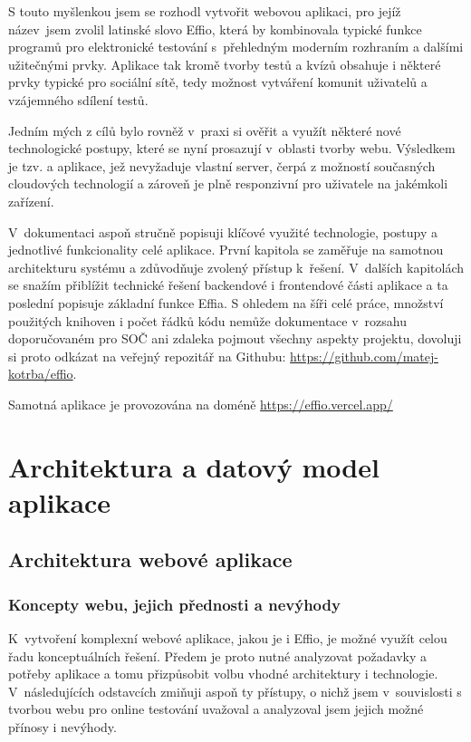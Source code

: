 \documentclass[12pt, a4paper,
openright
]{report}
\let\oldchapter\chapter
\renewcommand{\chapter}{
	\clearpage
	\pagestyle{fancy}
	\oldchapter
}
\begin{document}
S touto myšlenkou jsem se rozhodl vytvořit webovou aplikaci, pro jejíž název~jsem zvolil latinské slovo Effio, která by kombinovala typické funkce programů pro elektronické testování s~přehledným moderním rozhraním a dalšími užitečnými prvky. Aplikace tak kromě tvorby testů a kvízů obsahuje i některé prvky typické pro sociální sítě, tedy možnost vytváření komunit uživatelů a vzájemného sdílení testů. 

Jedním mých z cílů bylo rovněž v~praxi si ověřit a využít některé nové technologické postupy, které se nyní prosazují v~oblasti tvorby webu. Výsledkem je tzv. 
 a  aplikace, jež nevyžaduje vlastní server, čerpá z možností současných cloudových technologií a zároveň je plně responzivní pro uživatele na jakémkoli zařízení.

V~dokumentaci aspoň stručně popisuji klíčové využité technologie, postupy a jednotlivé funkcionality celé aplikace. První kapitola se zaměřuje na samotnou architekturu systému a zdůvodňuje zvolený přístup k~řešení. V~dalších kapitolách se snažím přiblížit technické řešení backendové i frontendové části aplikace a ta poslední popisuje základní funkce Effia. S ohledem na šíři celé práce, množství použitých knihoven i počet řádků kódu nemůže dokumentace v~rozsahu doporučovaném pro SOČ ani zdaleka pojmout všechny aspekty projektu, dovoluji si proto odkázat na veřejný repozitář na Githubu: \url{https://github.com/matej-kotrba/effio}.

Samotná aplikace je provozována na doméně \url{https://effio.vercel.app/}



\chapter{Architektura a datový model aplikace}

\section{Architektura webové aplikace}

\subsection{Koncepty webu, jejich přednosti a nevýhody}
K~vytvoření komplexní webové aplikace, jakou je i Effio, je možné využít celou řadu konceptuálních řešení. Předem je proto nutné analyzovat požadavky a potřeby aplikace a tomu přizpůsobit volbu vhodné architektury i technologie. V~následujících odstavcích zmiňuji aspoň ty přístupy, o nichž jsem v~souvislosti s tvorbou webu pro online testování uvažoval a analyzoval jsem jejich možné přínosy i nevýhody.
\end{document}
